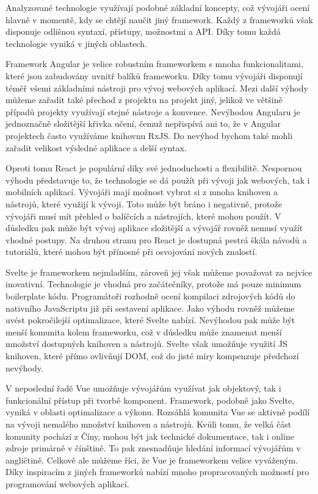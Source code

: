 \begin{zvyraznenyodstavec}
Analyzované technologie využívají podobné základní koncepty, což vývojáři ocení hlavně v momentě, kdy se chtějí naučit jiný framework. 
Každý z frameworků však disponuje odlišnou syntaxí, přístupy, možnostmi a API. Díky tomu každá technologie vyniká v jiných oblastech.

Framework Angular je velice robustním frameworkem s mnoha funkcionalitami, které jsou zabudovány uvnitř balíků frameworku. 
Díky tomu vývojáři disponují téměř všemi základními nástroji pro vývoj webových aplikací. 
Mezi další výhody můžeme zařadit také přechod z projektu na projekt jiný, jelikož ve většině případů projekty využívají stejné nástroje a konvence. 
Nevýhodou Angularu je jednoznačně složitější křivka učení, čemuž nepřispívá ani to, že v Angular projektech často využíváme knihovnu RxJS. 
Do nevýhod bychom také mohli zařadit velikost výsledné aplikace a delší syntax.

Oproti tomu React je populární díky své jednoduchosti a flexibilitě. 
Nespornou výhodu představuje to, že technologie se dá použít při vývoji jak webových, tak i mobilních aplikací. 
Vývojáři mají možnost vybrat si z mnoha knihoven a nástrojů, které využijí k vývoji. 
Toto může být bráno i negativně, protože vývojáři musí mít přehled o balíčcích a nástrojích, které mohou použít. 
V důsledku pak může být vývoj aplikace složitější a vývojář rovněž nemusí využít vhodné postupy. 
Na druhou stranu pro React je dostupná pestrá škála návodů a tutoriálů, které mohou být přínosné při osvojování nových znalostí.

Svelte je frameworkem nejmladším, zároveň jej však můžeme považovat za nejvíce inovativní. 
Technologie je vhodná pro začátečníky, protože má pouze minimum boilerplate kódu. 
Programátoři rozhodně ocení kompilaci zdrojových kódů do nativního JavaScriptu již při sestavení aplikace. 
Jako výhodu rovněž můžeme uvést pokročilejší optimalizace, které Svelte nabízí. 
Nevýhodou pak může být menší komunita kolem frameworku, což v důsledku může znamenat menší množství dostupných knihoven a nástrojů. 
Svelte však umožňuje využití JS knihoven, které přímo ovlivňují DOM, což do jisté míry kompenzuje předchozí nevýhody.

V neposlední řadě Vue umožňuje vývojářům využívat jak objektový, tak i funkcionální přístup při tvorbě komponent. 
Framework, podobně jako Svelte, vyniká v oblasti optimalizace a výkonu. Rozsáhlá komunita Vue se aktivně podílí na vývoji nemalého množství knihoven a nástrojů. 
Kvůli tomu, že velká část komunity pochází z Číny, mohou být jak technické dokumentace, tak i online zdroje primárně v čínštině. 
To pak znesnadňuje hledání informací vývojářům v angličtině. Celkově ale můžeme říci, že Vue je frameworkem velice vyváženým. 
Díky inspiracím z jiných frameworků nabízí mnoho propracovaných možností pro programování webových aplikací.
\end{zvyraznenyodstavec}